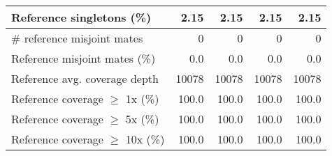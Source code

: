 \documentclass[12pt,a4paper]{article}
\begin{document}
\begin{table}[ht]
\begin{center}
\begin{tabular}{|l*{4}{|r}|}
Reference singletons (\%) & 2.15 & 2.15 & 2.15 & 2.15 \\ \hline
\# reference misjoint mates & 0 & 0 & 0 & 0 \\ \hline
Reference misjoint mates (\%) & 0.0 & 0.0 & 0.0 & 0.0 \\ \hline
Reference avg. coverage depth & 10078 & 10078 & 10078 & 10078 \\ \hline
Reference coverage $\geq$ 1x (\%) & 100.0 & 100.0 & 100.0 & 100.0 \\ \hline
Reference coverage $\geq$ 5x (\%) & 100.0 & 100.0 & 100.0 & 100.0 \\ \hline
Reference coverage $\geq$ 10x (\%) & 100.0 & 100.0 & 100.0 & 100.0 \\ \hline
\end{tabular}
\end{center}
\end{table}
\end{document}
